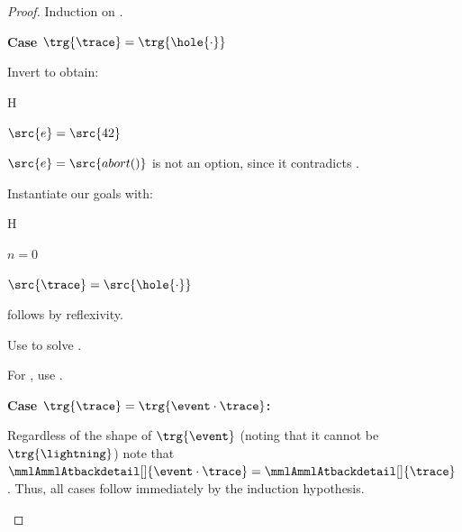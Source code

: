 \documentclass[a4paper,names,dvipsnames]{article}
\begin{document}
\begin{proof}
  Induction on .

  \begin{description}
  \item \textbf{Case $\trg{\trace}=\trg{\hole{\cdot}}$}

  Invert  to obtain:
  \begin{passumptions}{H}
    \item $\src{e}=\src{42}$
  \end{passumptions}
  $\src{e}=\src{abort()}$ is not an option, since it contradicts .

  Instantiate our goals with:
  \begin{passumptions}{H}
    \setcounter{enumi}{1}
    \item $n=0$
    \item $\src{\trace}=\src{\hole{\cdot}}$
  \end{passumptions}

   follows by reflexivity.

  \noindent Use  to solve .

  \noindent For , use .

  \item \textbf{Case $\trg{\trace}=\trg{\event\cdot\trace}$:}

  Regardless of the shape of $\trg{\event}$ (noting that it cannot be $\trg{\lightning}$) note that $\mmlAmmlAtbackdetail[]{\event\cdot\trace}=\mmlAmmlAtbackdetail[]{\trace}$.
  Thus, all cases follow immediately by the induction hypothesis.
  \end{description}
\end{proof}
\end{document}
